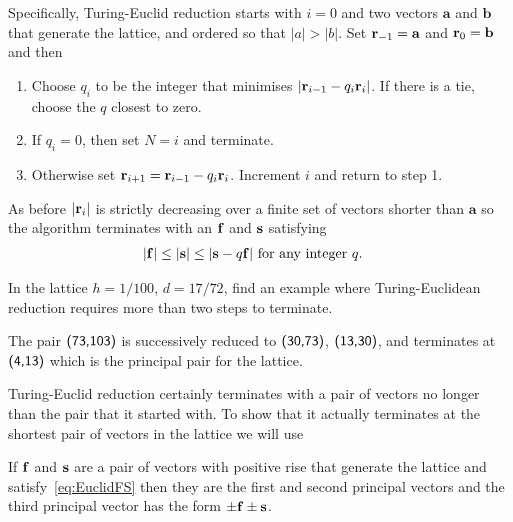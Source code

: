 Specifically, Turing-Euclid reduction starts with 
$i=0$ and two vectors $\mathbf{a}$ and $\mathbf{b}$ that generate the lattice, and ordered so that
$|a|>|b|$. Set $\mathbf{r}_{-1}=\mathbf{a}$ and $\mathbf{r}_{0}=\mathbf{b}$ and then
\begin{enumerate}
	\item Choose $q_i$ to be the integer that minimises  $|\mathbf{r}_{i-1}-q_i\mathbf{r}_{i}|$. If there is a tie, choose the $q$ closest to zero. 
	\item If $q_i=0$, then set $N=i$ and terminate.	
	\item Otherwise set  $\mathbf{r}_{i+1}=\mathbf{r}_{i-1}-q_i\mathbf{r}_{i}$. Increment $i$ and return to step 1.
\end{enumerate}
As before $|\mathbf{r}_{i}|$ is strictly decreasing over a finite set of vectors shorter than $\mathbf{a}$ so the algorithm terminates with an $\mathbf{f}$ and $\mathbf{s}$ satisfying 
\begin{align}
	\label{eq:EuclidFS}
	|\mathbf{f}|&\leq|\mathbf{s}| \leq |\mathbf{s}-q\mathbf{f}| \mbox{ for any integer $q$}.
\end{align}

\begin{jExercise}
	In the lattice $h=1/100$, $d=17/72$, find an example where Turing-Euclidean reduction  requires more than two steps to terminate.
\end{jExercise}
\begin{jAnswer}
	The pair $\textsf{(73,103)}$ is successively reduced to $\textsf{(30,73)}$, $\textsf{(13,30)}$, and terminates at $\textsf{(4,13)}$ which  is the principal pair for the lattice. 
\end{jAnswer}

Turing-Euclid reduction certainly terminates with a pair of vectors no longer than the pair that it started with. To show that it actually terminates at the shortest pair of vectors in the lattice we will use
\begin{theorem}
	If $\mathbf{f}$ and $\mathbf{s}$ are a pair of vectors with positive rise that generate the lattice and satisfy~\eqref{eq:EuclidFS} then they are the first and second principal vectors and the third principal vector has the form $\pm\mathbf{f}\pm\mathbf{s}$. 
	\label{thm:third}
\end{theorem}

